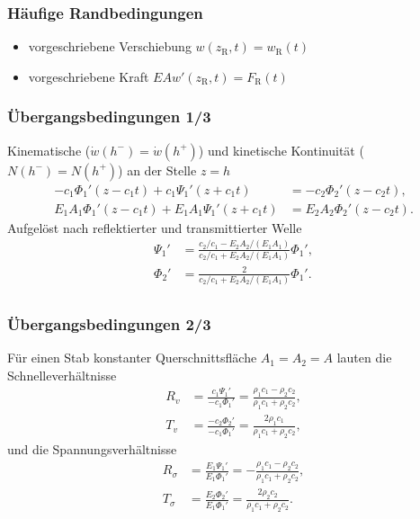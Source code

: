 \documentclass[hyperref={pdfpagemode=FullScreen, colorlinks=false}]{beamer}
\begin{document}
\begin{frame}
 \frametitle{Häufige Randbedingungen}

\begin{itemize}
 \item vorgeschriebene Verschiebung \quad $w(z_\mathrm{R},t)=w_\mathrm{R}(t)$
 \item vorgeschriebene Kraft \qquad $EA w'(z_\mathrm{R},t)=F_\mathrm{R}(t)$
\end{itemize}

\bigskip



\end{frame} 


\begin{frame}
 \frametitle{Übergangsbedingungen 1/3}

 
Kinematische ($\dot{w}(h^-)=\dot{w}(h^+)$) und kinetische Kontinuität ($N(h^-)=N(h^+)$) an der Stelle $z=h$
\begin{align*}
 -c_1\Phi_1'(z-c_1t) + c_1\Psi_1'(z+c_1t) &= -c_2\Phi_2'(z-c_2t),  \\
 E_1A_1\Phi_1'(z-c_1t) + E_1A_1 \Psi_1'(z+c_1t) &= E_2A_2\Phi_2'(z-c_2t).
\end{align*}
Aufgelöst nach reflektierter und transmittierter Welle
\begin{align*}
 \Psi_1' &= \frac{c_2/c_1 - E_2 A_2/(E_1 A_1)}{c_2/c_1+ E_2 A_2/(E_1 A_1)}\Phi_1',\\
 \Phi_2' &= \frac{2}{c_2/c_1 + E_2 A_2/(E_1 A_1)}\Phi_1'.\\
\end{align*}
\end{frame} 


\begin{frame}
 \frametitle{Übergangsbedingungen 2/3}
  Für einen Stab konstanter Querschnittsfläche $A_1=A_2=A$ lauten die Schnelleverhältnisse
  \begin{align*}
   R_v&=\frac{c_1\Psi_1'}{-c_1\Phi_1'}=\frac{\rho_1 c_1 - \rho_2 c_2}{\rho_1 c_1 + \rho_2 c_2}, \\
   T_v&= \frac{-c_2\Phi_2'}{-c_1\Phi_1'}=\frac{2\rho_1 c_1}{\rho_1 c_1 + \rho_2 c_2 },
  \end{align*}
und die Spannungsverhältnisse
\begin{align*}
   R_\sigma &= \frac{E_1\Psi_1'}{E_1\Phi_1'}=-\frac{\rho_1 c_1 - \rho_2 c_2}{\rho_1 c_1 + \rho_2 c_2}, \\
   T_\sigma &= \frac{E_2\Phi_2'}{E_1\Phi_1'}=\frac{2\rho_2 c_2}{\rho_1 c_1 + \rho_2 c_2 }.
\end{align*}  
\end{frame} 
\end{document}
